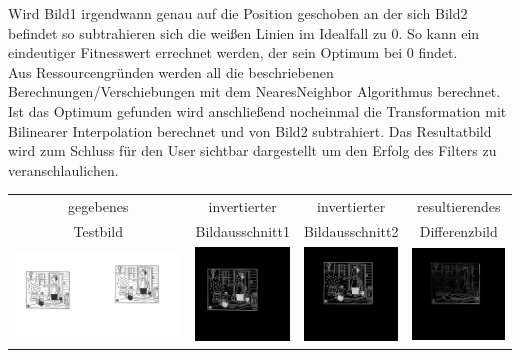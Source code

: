 \documentclass[12pt,german]{article}
\begin{document}
Wird Bild1 irgendwann genau auf die Position geschoben an der sich Bild2 befindet so subtrahieren sich die weißen Linien im Idealfall zu $0$. So kann ein eindeutiger Fitnesswert errechnet werden, der sein Optimum bei $0$ findet.\\
Aus Ressourcengründen werden all die beschriebenen Berechnungen/Verschiebungen mit dem NearesNeighbor Algorithmus berechnet. Ist das Optimum gefunden wird anschließend nocheinmal die Transformation mit Bilinearer Interpolation berechnet und von Bild2 subtrahiert. Das Resultatbild wird zum Schluss für den User sichtbar dargestellt um den Erfolg des Filters zu veranschlaulichen. \\

\begin{table}[H]
  \centering
  \begin{tabular}{| c | c | c | c |}
	\hline
	gegebenes & invertierter & invertierter & resultierendes \\	
	Testbild & Bildausschnitt1 & Bildausschnitt2 & Differenzbild \\ 
    \hline
    \includegraphics[width=5cm]{images/autoregister/binary1.jpg} &
    \includegraphics[width=2.5cm]{images/autoregister/binary1FH.jpg} &
    \includegraphics[width=2.5cm]{images/autoregister/binary1SH.jpg} &
    \includegraphics[width=2.5cm]{images/autoregister/binary1DIFF.jpg} \\

\end{tabular}
\end{table}
\end{document}
